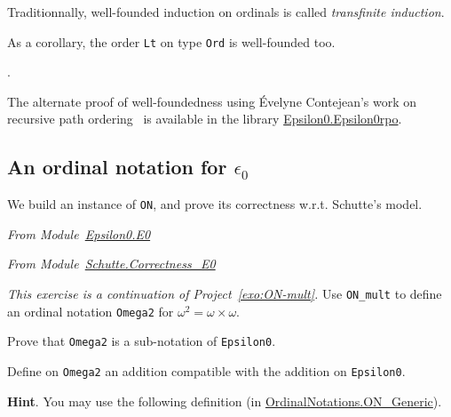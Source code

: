 





Traditionnally, well-founded induction on ordinals is called \emph{transfinite induction}.


As a corollary, the order \texttt{Lt} on type \texttt{Ord} is well-founded too.

.


\begin{remark}
\label{remark:a3pat}
The alternate proof of well-foundedness using \'Evelyne Contejean's work on
    recursive path ordering~\cite{DershowitzRPO, a3pat} is available in the
    library \href{../theories/html/hydras.Epsilon0.Epsilon0rpo.html}{Epsilon0.Epsilon0rpo}.
 \end{remark}



\subsection{An ordinal notation for  \texorpdfstring{$\epsilon_0$}{epsilon0}}

We build an instance of \texttt{ON}, and prove its correctness w.r.t. Schutte's model.

\emph{From Module~\href{../theories/html/hydras.Epsilon0.E0.html}{Epsilon0.E0}}



\label{instance-epsilon0}

\emph{From Module~\href{../theories/html/hydras.Schutte.Correctness_E0.html}{Schutte.Correctness\_E0}}








\begin{project}
 \emph{This exercise is a continuation of Project~\vref{exo:ON-mult}.}
Use \texttt{ON\_mult} to define an ordinal notation \texttt{Omega2} for $\omega^2=\omega\times\omega$.

Prove that \texttt{Omega2} is a sub-notation of \texttt{Epsilon0}.

Define on \texttt{Omega2} an addition compatible with the addition on \texttt{Epsilon0}.

\textbf{Hint}. You may use the following definition (in 
    \href{../theories/html/hydras.OrdinalNotations.ON_Generic.html}{OrdinalNotations.ON\_Generic}).


    
     \end{project}

